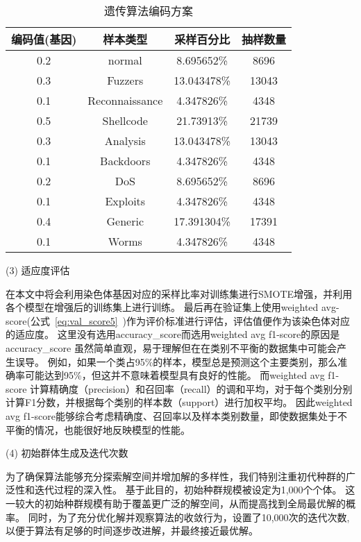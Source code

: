 \begin{table}
  \caption{遗传算法编码方案}
  \label{tab:Ga_code}
  \centering
  \begin{tabular}{cccc}
    \toprule
    \textbf{编码值(基因)}&\textbf{样本类型}&\textbf{采样百分比}&\textbf{抽样数量}\\
    \midrule
    0.2&normal&8.695652\%&8696\\
    0.3&Fuzzers&13.043478\%&13043\\
    0.1&Reconnaissance&4.347826\%&4348\\
    0.5&Shellcode&21.73913\%&21739\\
    0.3&Analysis&13.043478\%&13043\\
    0.1&Backdoors&4.347826\%&4348\\
    0.2&DoS&8.695652\%&8696\\
    0.1&Exploits&4.347826\%&4348\\
    0.4&Generic&17.391304\%&17391\\
    0.1&Worms&4.347826\%&4348\\
    \bottomrule
  \end{tabular}
\end{table}

(3) 适应度评估\par
在本文中将会利用染色体基因对应的采样比率对训练集进行SMOTE增强，并利用各个模型在增强后的训练集上进行训练。
最后再在验证集上使用weighted avg-score(公式~\ref{eq:val_score5}~)作为评价标准进行评估，评估值便作为该染色体对应的适应度。
这里没有选用accuracy\_score而选用weighted avg f1-score的原因是
accuracy\_score 虽然简单直观，易于理解但在在类别不平衡的数据集中可能会产生误导。
例如，如果一个类占95\%的样本，模型总是预测这个主要类别，那么准确率可能达到95\%，但这并不意味着模型具有良好的性能。
而weighted avg f1-score 计算精确度（precision）和召回率（recall）的调和平均，对于每个类别分别计算F1分数，并根据每个类别的样本数（support）进行加权平均。
因此weighted avg f1-score能够综合考虑精确度、召回率以及样本类别数量，即使数据集处于不平衡的情况，也能很好地反映模型的性能。\par

(4) 初始群体生成及迭代次数\par
为了确保算法能够充分探索解空间并增加解的多样性，我们特别注重初代种群的广泛性和迭代过程的深入性。
基于此目的，初始种群规模被设定为1,000个个体。
这一较大的初始种群规模有助于覆盖更广泛的解空间，从而提高找到全局最优解的概率。
同时，为了充分优化解并观察算法的收敛行为，设置了10,000次的迭代次数,以便于算法有足够的时间逐步改进解，并最终接近最优解。\par

